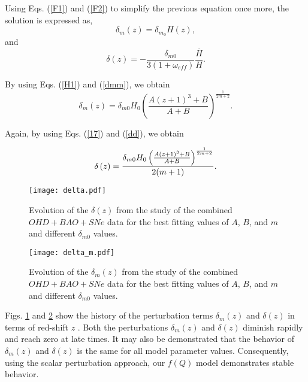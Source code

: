 \documentclass[prd,superscriptaddress,amsfonts,amssymb,amsmath,showpacs,twocolumn]{revtex4-2}
\begin{document}
Using Eqs. (\ref{F1}) and (\ref{F2}) to simplify the previous equation once
more, the solution is expressed as, 
\begin{equation}
\delta _{m}\left( z\right)  =\delta _{m_{0}}H\left( z\right),
\label{dmm}
\end{equation}
and 
\begin{equation}
\delta \left( z\right)  =-\frac{\delta _{m0}}{3\left( 1+\omega
_{eff}\right) }\frac{\overset{.}{H}}{H}.
\label{dd}
\end{equation}

By using Eqs. (\ref{H1}) and (\ref{dmm}), we obtain
\begin{equation}
    \delta _{m}\left( z\right)  =\delta _{m0}H_{0}\left( \frac{A(z+1)^{3}+B}{A+B}\right) ^{\frac{1}{2m+2}}.
\end{equation}

Again, by using Eqs. (\ref{17}) and (\ref{dd}), we obtain

\begin{equation}
    \delta \left( z\right)  =\frac{\delta _{m0}H_{0}\left( \frac{A(z+1)^{3}+B}{A+B}\right) ^{\frac{1}{%
2m+2}}}{2(m+1)}.
\end{equation}

\begin{figure}[h]
\centerline{\texttt{[image: delta.pdf]}}
\caption{Evolution of the $\delta(z)$ from the study of the
combined $OHD+BAO+SNe$ data for the best fitting values of $A$, $B$, and $m$ and different $\delta_{m0}$ values.}
\label{d}
\end{figure}

\begin{figure}[h]
\centerline{\texttt{[image: delta\_m.pdf]}}
\caption{Evolution of the $\delta_{m}(z)$ from the study of the
combined $OHD+BAO+SNe$ data for the best fitting values of $A$, $B$, and $m$ and different $\delta_{m0}$ values.}
\label{dm}
\end{figure}

Figs. \ref{d} and \ref{dm} show the history of the perturbation terms $\delta
_{m}\left( z\right) $ and $\delta \left( z\right) $ in terms of red-shift $z$%
. Both the perturbations $\delta _{m}\left( z\right) $ and $\delta \left(
z\right) $ diminish rapidly and reach zero at late times. It may also be
demonstrated that the behavior of  $\delta _{m}\left( z\right) $ and $\delta
\left( z\right) $ is the same for all model parameter values. Consequently,
using the scalar perturbation approach, our $f(Q)$ model demonstrates stable
behavior.
\end{document}
